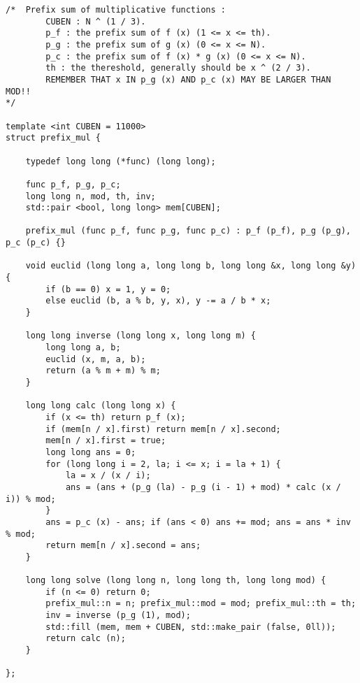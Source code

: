 \begin{lstlisting}
/*	Prefix sum of multiplicative functions :
		CUBEN : N ^ (1 / 3).
		p_f : the prefix sum of f (x) (1 <= x <= th).
		p_g : the prefix sum of g (x) (0 <= x <= N).
		p_c : the prefix sum of f (x) * g (x) (0 <= x <= N).
		th : the thereshold, generally should be x ^ (2 / 3).
		REMEMBER THAT x IN p_g (x) AND p_c (x) MAY BE LARGER THAN MOD!!
*/

template <int CUBEN = 11000>
struct prefix_mul {

	typedef long long (*func) (long long);

	func p_f, p_g, p_c;
	long long n, mod, th, inv;
	std::pair <bool, long long> mem[CUBEN];

	prefix_mul (func p_f, func p_g, func p_c) : p_f (p_f), p_g (p_g), p_c (p_c) {}

	void euclid (long long a, long long b, long long &x, long long &y) {
		if (b == 0) x = 1, y = 0;
		else euclid (b, a % b, y, x), y -= a / b * x;
	}

	long long inverse (long long x, long long m) {
		long long a, b;
		euclid (x, m, a, b);
		return (a % m + m) % m;
	}

	long long calc (long long x) {
		if (x <= th) return p_f (x);
		if (mem[n / x].first) return mem[n / x].second;
		mem[n / x].first = true;
		long long ans = 0;
		for (long long i = 2, la; i <= x; i = la + 1) {
			la = x / (x / i);
			ans = (ans + (p_g (la) - p_g (i - 1) + mod) * calc (x / i)) % mod;
		}
		ans = p_c (x) - ans; if (ans < 0) ans += mod; ans = ans * inv % mod;
		return mem[n / x].second = ans;
	}

	long long solve (long long n, long long th, long long mod) {
		if (n <= 0) return 0;
		prefix_mul::n = n; prefix_mul::mod = mod; prefix_mul::th = th;
		inv = inverse (p_g (1), mod);
		std::fill (mem, mem + CUBEN, std::make_pair (false, 0ll));
		return calc (n); 
	}

};
\end{lstlisting}

